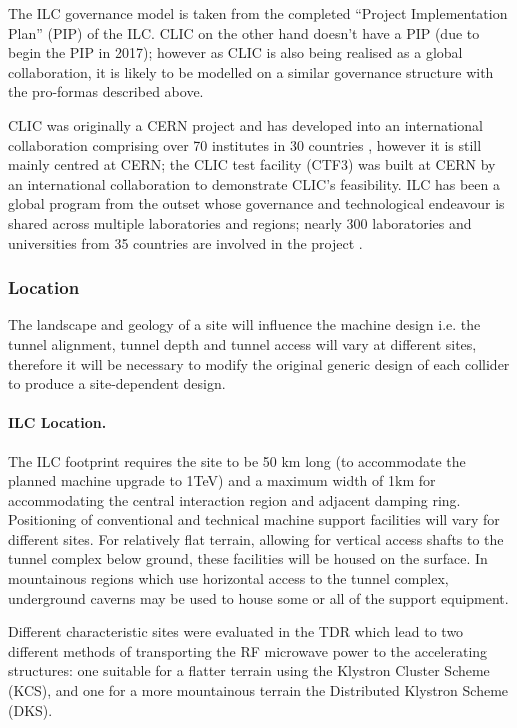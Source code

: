 The ILC governance model is taken from the completed ``Project Implementation Plan'' (PIP) of the ILC. CLIC on the other hand doesn't have a PIP (due to begin the PIP in 2017); however as CLIC is also being realised as a global collaboration, it is likely to be modelled on a similar governance structure with the pro-formas described above.

CLIC was originally a CERN project and has developed into an international collaboration comprising over 70 institutes in 30 countries \cite{CLIC:Organisation}, however it is still mainly centred at CERN; the CLIC test facility (CTF3) was built at CERN by an international collaboration to demonstrate CLIC's feasibility. ILC has been a global program from the outset whose governance and technological endeavour is shared across multiple laboratories and regions; nearly 300 laboratories and universities from 35 countries are involved in the project \cite{ILC:Collab}.

\subsubsection{Location}

The landscape and geology of a site will influence the machine design i.e. the tunnel alignment, tunnel depth and tunnel access will vary at different sites, therefore it will be necessary to modify the original generic design of each collider to produce a site-dependent design.

\paragraph{ILC Location.}

The ILC footprint requires the site to be 50 km long (to accommodate the planned machine upgrade to 1TeV) and a maximum width of 1km for accommodating the central interaction region and adjacent damping ring. Positioning of conventional and technical machine support facilities will vary for different sites. For relatively flat terrain, allowing for vertical access shafts to the tunnel complex below ground, these facilities will be housed on the surface. In mountainous regions which use horizontal access to the tunnel complex, underground caverns may be used to house some or all of the support equipment. \cite{ILC:PIPReport}

Different characteristic sites were evaluated in the TDR which lead to two different methods of transporting the RF microwave power to the accelerating structures: one suitable for a flatter terrain using the Klystron Cluster Scheme (KCS), and one for a more mountainous terrain \textendash the Distributed Klystron Scheme (DKS). \cite{ILC:TechnicalDesignReport}

